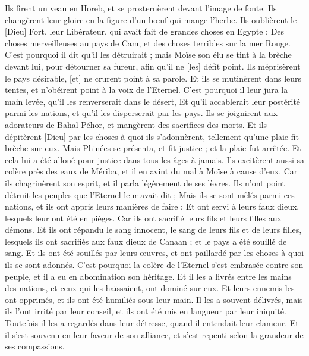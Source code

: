 \begin{multicols}{2}
Ils firent un veau en Horeb, et se prosternèrent devant l'image de fonte.
Ils changèrent leur gloire en la figure d'un bœuf qui mange l'herbe.
Ils oublièrent le [Dieu] Fort, leur Libérateur, qui avait fait de grandes choses en Egypte ;
Des choses merveilleuses au pays de Cam, et des choses terribles sur la mer Rouge.
C'est pourquoi il dit qu'il les détruirait ; mais Moïse son élu se tint à la brèche devant lui, pour détourner sa fureur, afin qu'il ne [les] défît point.
Ils méprisèrent le pays désirable, [et] ne crurent point à sa parole.
Et ils se mutinèrent dans leurs tentes, et n'obéirent point à la voix de l'Eternel.
C'est pourquoi il leur jura la main levée, qu'il les renverserait dans le désert,
Et qu'il accablerait leur postérité parmi les nations, et qu'il les disperserait par les pays.
Ils se joignirent aux adorateurs de Bahal-Péhor, et mangèrent des sacrifices des morts.
Et ils dépitèrent [Dieu] par les choses à quoi ils s'adonnèrent, tellement qu'une plaie fit brèche sur eux.
Mais Phinées se présenta, et fit justice ; et la plaie fut arrêtée.
Et cela lui a été alloué pour justice dans tous les âges à jamais.
Ils excitèrent aussi sa colère près des eaux de Mériba, et il en avint du mal à Moïse à cause d'eux.
Car ils chagrinèrent son esprit, et il parla légèrement de ses lèvres.
Ils n'ont point détruit les peuples que l'Eternel leur avait dit ;
Mais ils se sont mêlés parmi ces nations, et ils ont appris leurs manières de faire ;
Et ont servi à leurs faux dieux, lesquels leur ont été en pièges.
Car ils ont sacrifié leurs fils et leurs filles aux démons.
Et ils ont répandu le sang innocent, le sang de leurs fils et de leurs filles, lesquels ils ont sacrifiés aux faux dieux de Canaan ; et le pays a été souillé de sang.
Et ils ont été souillés par leurs œuvres, et ont paillardé par les choses à quoi ils se sont adonnés.
C'est pourquoi la colère de l'Eternel s'est embrasée contre son peuple, et il a eu en abomination son héritage.
Et il les a livrés entre les mains des nations, et ceux qui les haïssaient, ont dominé sur eux.
Et leurs ennemis les ont opprimés, et ils ont été humiliés sous leur main.
Il les a souvent délivrés, mais ils l'ont irrité par leur conseil, et ils ont été mis en langueur par leur iniquité.
Toutefois il les a regardés dans leur détresse, quand il entendait leur clameur.
Et il s'est souvenu en leur faveur de son alliance, et s'est repenti selon la grandeur de ses compassions.

\end{multicols}
